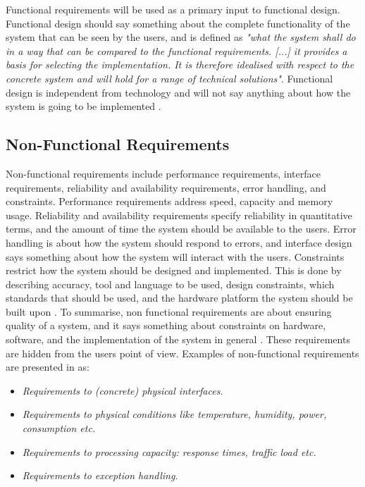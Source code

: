 Functional requirements will be used as a primary input to functional design. Functional design should say something about the complete functionality of the system that can be seen by the users, and is defined as \emph{"what the system shall do in a way that can be compared to the functional requirements. [...] it provides a basis for selecting the implementation. It is therefore idealised with respect to the concrete system and will hold for a range of technical solutions"}. Functional design is independent from technology and will not say anything about how the system is going to be implemented \cite{systemutviklingDel1}. 

\subsection{Non-Functional Requirements}
Non-functional requirements include performance requirements, interface requirements, reliability and availability requirements, error handling, and constraints. Performance requirements address speed, capacity and memory usage. Reliability and availability requirements specify reliability in quantitative terms, and the amount of time the system should be available to the users. Error handling is about how the system should respond to errors, and interface design says something about how the system will interact with the users. Constraints restrict how the system should be designed and implemented. This is done by describing accuracy, tool and language to be used, design constraints, which standards that should be used, and the hardware platform the system should be built upon \cite{braude2000software}. To summarise, non functional requirements are about ensuring quality of a system, and it says something about constraints on hardware, software, and the implementation of the system in general \cite{mmi}. These requirements are hidden from the users point of view. Examples of non-functional requirements are presented in \cite{systemutviklingDel1} as:
\begin{itemize}
\item \emph{Requirements to (concrete) physical interfaces.}
\item \emph{Requirements to physical conditions like temperature, humidity, power, consumption etc.}
\item \emph{Requirements to processing capacity: response times, traffic load etc.}
\item \emph{Requirements to exception handling.} \\ \\ 
\end{itemize}   

